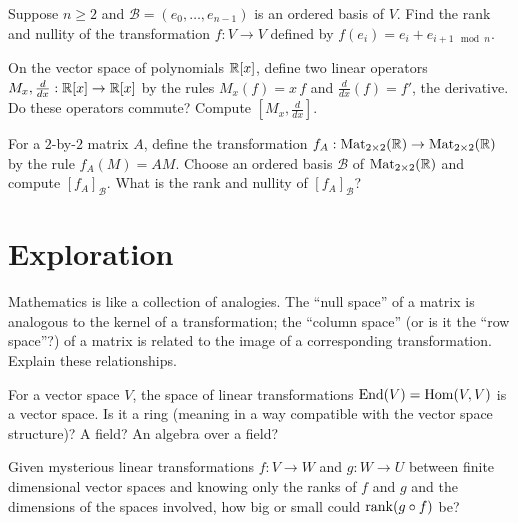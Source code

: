 \documentclass{homework}
\begin{document}
\begin{problem}
  Suppose $n \geq 2$ and $\mathcal{B} = (e_0,\ldots,e_{n-1})$ is an ordered basis of $V$.  Find the rank and nullity of the transformation $f : V \to V$ defined by $f(e_i) = e_i + e_{i+1 \mod n}$.
\end{problem}

\begin{problem}\label{derivative-multiplication-commute}On the vector space of polynomials $\mathbb{R}[x]$, define two linear operators $M_x, \frac{d}{dx} : \mathbb{R}[x] \to \mathbb{R}[x]$ by the rules $M_x(f) = x \, f$ and $\frac{d}{dx}(f) = f'$, the derivative.  Do these operators commute?  Compute $[M_x,\frac{d}{dx}]$.
\end{problem}

\begin{problem}
  For a $2$-by-$2$ matrix $A$, define the transformation
  $f_A : \operatorname{Mat}_{2\times 2}(\mathbb{R}) \to \operatorname{Mat}_{2\times 2}(\mathbb{R})$ by the rule
  $f_A(M) = AM$.  Choose an ordered basis
  $\mathcal{B}$ of $\operatorname{Mat}_{2\times 2}(\mathbb{R})$ and compute
  $[f_A]_{\mathcal{B}}$.  What is the rank and nullity of $[f_A]_{\mathcal{B}}$?
\end{problem}

\section{Exploration}

\begin{problem}
  Mathematics is like a collection of analogies.  The ``null space''
  of a matrix is analogous to the kernel of a transformation; the
  ``column space'' (or is it the ``row space''?) of a matrix is
  related to the image of a corresponding transformation.  Explain these relationships.
\end{problem}

\begin{problem}
  For a vector space $V$, the space of linear transformations
  $\operatorname{End}(V) = \operatorname{Hom}(V,V)$ is a vector space.  Is it a ring (meaning in a
  way compatible with the vector space structure)?  A field?  An
  algebra over a field?
\end{problem}

\begin{problem}
  Given mysterious linear transformations $f : V \to W$ and
  $g : W \to U$ between finite dimensional vector spaces and knowing
  only the ranks of $f$ and $g$ and the dimensions of the spaces
  involved, how big or small could $\operatorname{rank} (g \circ f)$ be?
\end{problem}
\end{document}
